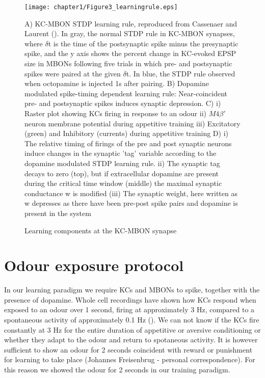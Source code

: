 \begin{figure}[H]
%
\texttt{[image: chapter1/Figure3\_learningrule.eps]} {\caption[Learning
components at the KC-MBON synapse]{%
Learning components at the KC-MBON synapse%
}
}

\begin{minipage}[t]{1\columnwidth}%
A) KC-MBON STDP learning rule, reproduced from Cassenaer and Laurent
(\citealp{Cassenaer:2007go}). In gray, the normal STDP rule in KC-MBON
synapses, where $\delta$t is the time of the postsynaptic spike minus
the presynaptic spike, and the y axis shows the percent change in
KC-evoked EPSP size in MBONs following five trials in which pre- and
postsynaptic spikes were paired at the given $\delta$t. In blue,
the STDP rule observed when octopamine is injected 1s after pairing.
B) Dopamine modulated spike-timing dependent learning rule: Near-coincident
pre- and postsynaptic spikes induces synaptic depression. C) i) Raster
plot showing KCs firing in response to an odour ii) $M4\beta'$  neuron
membrane potential during appetitive training iii) Excitatory (green)
and Inhibitory (currents) during appetitive training D) i) The relative
timing of firings of the pre and post synaptic neurons induce changes
in the synaptic 'tag' variable according to the dopamine modulated
STDP learning rule. ii) The synaptic tag decays to zero (top), but
if extracellular dopamine are present during the critical time window
(middle) the maximal synaptic conductance w is modified (iii) The
synaptic weight, here written as w depresses as there have been pre-post
spike pairs and dopamine is present in the system%
\end{minipage}%
\end{figure}

\section{Odour exposure protocol}

In our learning paradigm we require KCs and MBONs to spike, together
with the presence of dopamine. Whole cell recordings have shown how
KCs respond when exposed to an odour over 1 second, firing at approximately
3 Hz, compared to a spontaneous activity of approximately 0.1 Hz (\citealp{Turner:2008eo}).
We can not know if the KCs fire constantly at 3 Hz for the entire
duration of appetitive or aversive conditioning or whether they adapt
to the odour and return to spotaneous activity. It is however sufficient
to show an odour for 2 seconds coincident with reward or punishment
for learning to take place (Johannes Freisenbrug - personal correspondence).
For this reason we showed the odour for 2 seconds in our training
paradigm. 



